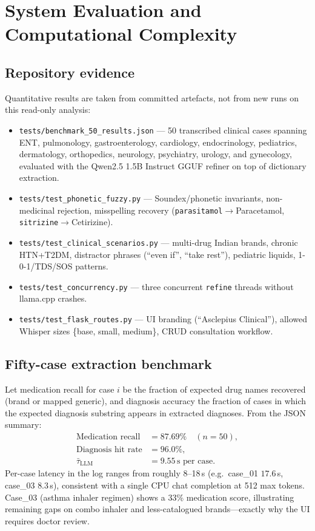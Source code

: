 \documentclass[11pt,a4paper]{article}
\begin{document}
\section{System Evaluation and Computational Complexity}

\subsection{Repository evidence}
Quantitative results are taken from committed artefacts, not from new runs on this read-only analysis:
\begin{itemize}[leftmargin=1.4em]
  \item \texttt{tests/benchmark\_50\_results.json} --- 50 transcribed clinical cases spanning ENT, pulmonology, gastroenterology, cardiology, endocrinology, pediatrics, dermatology, orthopedics, neurology, psychiatry, urology, and gynecology, evaluated with the Qwen2.5 1.5B Instruct GGUF refiner on top of dictionary extraction.
  \item \texttt{tests/test\_phonetic\_fuzzy.py} --- Soundex/phonetic invariants, non-medicinal rejection, misspelling recovery (\texttt{parasitamol}$\rightarrow$Paracetamol, \texttt{sitrizine}$\rightarrow$Cetirizine).
  \item \texttt{tests/test\_clinical\_scenarios.py} --- multi-drug Indian brands, chronic HTN+T2DM, distractor phrases (``even if'', ``take rest''), pediatric liquids, 1-0-1/TDS/SOS patterns.
  \item \texttt{tests/test\_concurrency.py} --- three concurrent \texttt{refine} threads without llama.cpp crashes.
  \item \texttt{tests/test\_flask\_routes.py} --- UI branding (``Asclepius Clinical''), allowed Whisper sizes \{base, small, medium\}, CRUD consultation workflow.
\end{itemize}

\subsection{Fifty-case extraction benchmark}
Let medication recall for case $i$ be the fraction of expected drug names recovered (brand or mapped generic), and diagnosis accuracy the fraction of cases in which the expected diagnosis substring appears in extracted diagnoses. From the JSON summary:
\begin{align}
  \text{Medication recall} &= 87.69\% \quad (n=50), \\
  \text{Diagnosis hit rate} &= 96.0\%, \\
  \bar{\tau}_{\text{LLM}} &= 9.55\,\text{s per case}.
\end{align}
Per-case latency in the log ranges from roughly 8--18\,s (e.g.\ case\_01 $17.6$\,s, case\_03 $8.3$\,s), consistent with a single CPU chat completion at 512 max tokens. Case\_03 (asthma inhaler regimen) shows a 33\% medication score, illustrating remaining gaps on combo inhaler and less-catalogued brands---exactly why the UI requires doctor review.
\end{document}
